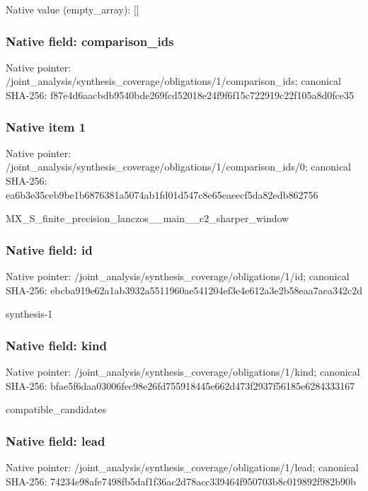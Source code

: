 \documentclass[10pt,a4paper]{article}
\begin{document}
Native value (empty\_\allowbreak{}array): []

\subsubsection{Native field: comparison\_\allowbreak{}ids}
Native pointer: /joint\_\allowbreak{}analysis/synthesis\_\allowbreak{}coverage/obligations/1/comparison\_\allowbreak{}ids; canonical SHA-256: f87e4d6aacbdb9540bde269fcd52018e24f9f6f15c722919c22f105a8d0fce35

\subsubsection{Native item 1}
Native pointer: /joint\_\allowbreak{}analysis/synthesis\_\allowbreak{}coverage/obligations/1/comparison\_\allowbreak{}ids/0; canonical SHA-256: ea6b3e35ceb9be1b6876381a5074ab1fd01d547c8e65eaeecf5da82edb862756

\begingroup\raggedright\sloppy MX\_\allowbreak{}S\_\allowbreak{}finite\_\allowbreak{}precision\_\allowbreak{}lanczos\_\allowbreak{}\_\allowbreak{}main\_\allowbreak{}\_\allowbreak{}c2\_\allowbreak{}sharper\_\allowbreak{}window\par\endgroup

\subsubsection{Native field: id}
Native pointer: /joint\_\allowbreak{}analysis/synthesis\_\allowbreak{}coverage/obligations/1/id; canonical SHA-256: ebcba919e62a1ab3932a5511960ae541204ef3e4e612a3e2b58eaa7aea342c2d

\begingroup\raggedright\sloppy synthesis-1\par\endgroup

\subsubsection{Native field: kind}
Native pointer: /joint\_\allowbreak{}analysis/synthesis\_\allowbreak{}coverage/obligations/1/kind; canonical SHA-256: bfae5f6daa03006fec98e26fd755918445e662d473f2937f56185e6284333167

\begingroup\raggedright\sloppy compatible\_\allowbreak{}candidates\par\endgroup

\subsubsection{Native field: lead}
Native pointer: /joint\_\allowbreak{}analysis/synthesis\_\allowbreak{}coverage/obligations/1/lead; canonical SHA-256: 74234e98afe7498fb5daf1f36ac2d78acc339464f950703b8c019892f982b90b
\end{document}
